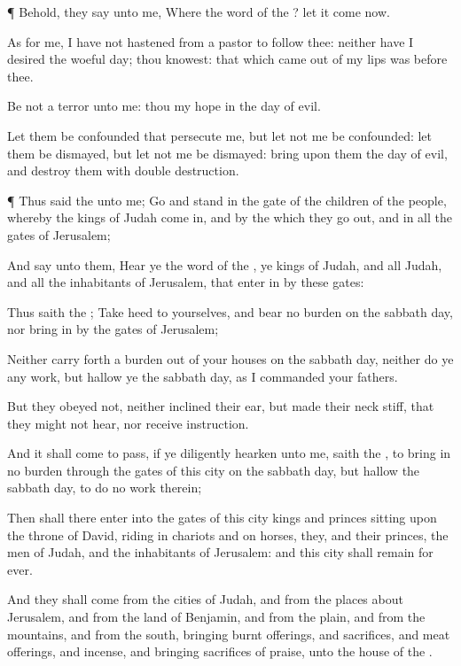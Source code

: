 {\par }{\PP {}¶ Behold, they
say unto me, Where
{} the
word of the
{}? let it
come now.

As for me, I have not
hastened from
{} a
pastor to
follow thee: neither have I
desired the
woeful
day; thou
knowest: that which came
out of my
lips was
{}
before
thee.

Be not a
terror unto me: thou
{} my
hope in the
day of
evil.

Let them be
confounded that
persecute me, but let not me be
confounded: let them be
dismayed, but let not me be
dismayed:
bring upon them the
day of
evil, and
destroy them with
double
destruction.


\par }{\PP {}¶ Thus
said the
{} unto me;
Go and
stand in the
gate of the
children of the
people, whereby the
kings of
Judah come
in, and by the which they go
out, and in all the
gates of
Jerusalem;

And
say unto them,
Hear ye the
word of the
{}, ye
kings of
Judah, and all
Judah, and all the
inhabitants of
Jerusalem, that enter
in by these
gates:

Thus
saith the
{}; Take
heed to
yourselves, and
bear no
burden on the
sabbath
day, nor
bring
{} in by the
gates of
Jerusalem;

Neither carry
forth a
burden out of your
houses on the
sabbath
day, neither
do ye any
work, but
hallow ye the
sabbath
day, as I
commanded your
fathers.

But they
obeyed not, neither
inclined their
ear, but made their
neck
stiff, that they might not
hear, nor
receive
instruction.

And it shall come to pass, if ye
diligently
hearken unto me,
saith the
{}, to
bring in no
burden through the
gates of this
city on the
sabbath
day, but
hallow the
sabbath
day, to
do
no
work therein;

Then shall there
enter into the
gates of this
city
kings and
princes
sitting upon the
throne of
David,
riding in
chariots and on
horses, they, and their
princes, the
men of
Judah, and the
inhabitants of
Jerusalem: and this
city shall
remain for
ever.

And they shall
come from the
cities of
Judah, and from the places
about
Jerusalem, and from the
land of
Benjamin, and from the
plain, and from the
mountains, and from the
south,
bringing burnt
offerings, and
sacrifices, and meat
offerings, and
incense, and
bringing sacrifices of
praise, unto the
house of the
{}.

}
